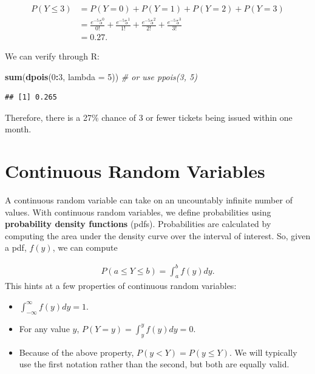 \documentclass[
]{krantz}
\newenvironment{Shaded}{\begin{snugshade}}{\end{snugshade}}
\newcommand{\CommentTok}[1]{\textcolor[rgb]{0.37,0.37,0.37}{\textit{#1}}}
\newcommand{\DataTypeTok}[1]{\textcolor[rgb]{0.27,0.27,0.27}{#1}}
\newcommand{\DecValTok}[1]{\textcolor[rgb]{0.06,0.06,0.06}{#1}}
\newcommand{\KeywordTok}[1]{\textcolor[rgb]{0.27,0.27,0.27}{\textbf{#1}}}
\newcommand{\NormalTok}[1]{#1}
\newcommand{\OperatorTok}[1]{\textcolor[rgb]{0.43,0.43,0.43}{\textbf{#1}}}
\providecommand{\tightlist}{%
  \setlength{\itemsep}{0pt}\setlength{\parskip}{0pt}}
\begin{document}
\begin{align*}
 P(Y \le 3) &= P(Y=0) + P(Y=1) + P(Y=2) + P(Y=3) \\
            &= \frac{e^{-5}5^0}{0!} + \frac{e^{-5}5^1}{1!} + \frac{e^{-5}5^2}{2!} + \frac{e^{-5}5^3}{3!}\\
            &= 0.27.
\end{align*}

We can verify through R:

\begin{Shaded}
\begin{Highlighting}[]
\KeywordTok{sum}\NormalTok{(}\KeywordTok{dpois}\NormalTok{(}\DecValTok{0}\OperatorTok{:}\DecValTok{3}\NormalTok{, }\DataTypeTok{lambda =} \DecValTok{5}\NormalTok{))   }\CommentTok{# or use ppois(3, 5)}
\end{Highlighting}
\end{Shaded}

\begin{verbatim}
## [1] 0.265
\end{verbatim}

Therefore, there is a 27\% chance of 3 or fewer tickets being issued within one month.

\hypertarget{continuous-random-variables}{%
\section{Continuous Random Variables}\label{continuous-random-variables}}

A continuous random variable can take on an uncountably infinite number of values. With continuous random variables, we define probabilities using \textbf{probability density functions} (pdfs).  Probabilities are calculated by computing the area under the density curve over the interval of interest. So, given a pdf, \(f(y)\), we can compute

\begin{align*}
P(a \le Y \le b) = \int_a^b f(y)dy.
\end{align*}
This hints at a few properties of continuous random variables:

\begin{itemize}
\tightlist
\item
  \(\int_{-\infty}^{\infty} f(y)dy = 1\).\\
\item
  For any value \(y\), \(P(Y = y) = \int_y^y f(y)dy = 0\).\\
\item
  Because of the above property, \(P(y < Y) = P(y \le Y)\). We will typically use the first notation rather than the second, but both are equally valid.
\end{itemize}
\end{document}
